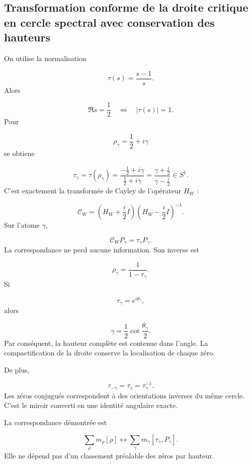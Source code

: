 \subsection{Transformation conforme de la droite critique en cercle spectral avec conservation des hauteurs}
On utilise la normalisation\par
\[
\tau(s)=\frac{s-1}{s}.
\]
Alors\par
\[
\Re s=\frac12
\quad\Longleftrightarrow\quad
|\tau(s)|=1.
\]
Pour\par
\[
\rho_\gamma=\frac12+i\gamma
\]
se obtiene\par
\[
\tau_\gamma
=
\tau(\rho_\gamma)
=
\frac{-\frac12+i\gamma}{\frac12+i\gamma}
=
\frac{\gamma+\frac i2}{\gamma-\frac i2}
\in S^1.
\]
C'est exactement la transformée de Cayley de l'opérateur \(H_W\) :\par
\[
\mathcal C_W
=
\left(H_W+\frac i2I\right)
\left(H_W-\frac i2I\right)^{-1}.
\]
Sur l'atome \(\gamma\),\par
\[
\mathcal C_WP_\gamma
=
\tau_\gamma P_\gamma.
\]
La correspondance ne perd aucune information. Son inverse est\par
\[
\rho_\gamma=\frac1{1-\tau_\gamma}.
\]
Si\par
\[
\tau_\gamma=e^{i\theta_\gamma},
\]
alors\par
\[
\boxed{
\gamma
=
\frac12\cot\frac{\theta_\gamma}{2}.
}
\]
Par conséquent, la hauteur complète est contenue dans l'angle. La compactification de la droite conserve la localisation de chaque zéro.\par
De plus,\par
\[
\tau_{-\gamma}
=
\overline{\tau_\gamma}
=
\tau_\gamma^{-1}.
\]
Les zéros conjugués correspondent à des orientations inverses du même cercle. C'est le miroir converti en une identité angulaire exacte.\par
La correspondance démontrée est\par
\[
\boxed{
\sum_\rho m_\rho[\rho]
\longleftrightarrow
\sum_\gamma m_\gamma
[\tau_\gamma,P_\gamma].
}
\]
Elle ne dépend pas d'un classement préalable des zéros par hauteur.\par
{}

